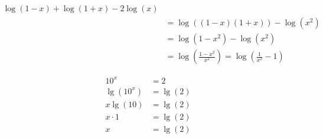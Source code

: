 \begin{align*}
    \log(1-x) + \log(1+x) - 2 \log(x) \\
    &= \log((1-x)(1+x)) - \log\left(x^2\right) \\
    &= \log(1-x^2) - \log\left(x^2\right) \\
    &= \log\left(\frac{1-x^2}{x^2}\right) = \log\left(\frac{1}{x^2}-1\right)
\end{align*}

\begin{align*}
    10^x &= 2 \\
    \lg\left(10^x\right) &= \lg(2) \\
    x \lg(10) &= \lg(2) \\
    x \cdot 1 &= \lg(2) \\
    x &= \lg(2)
\end{align*}
